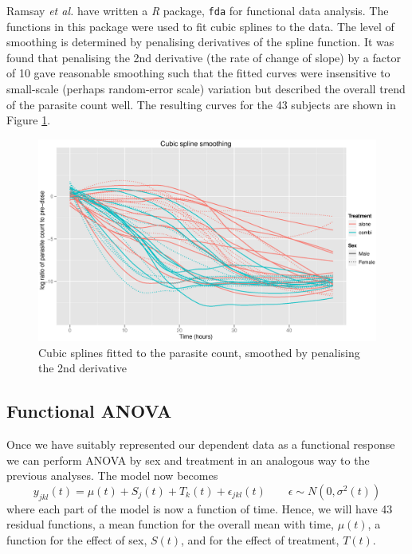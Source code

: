 Ramsay \textit{et al.} have written a \emph{R} package, \texttt{fda}\cite{fdaR, fdaRbook} for functional data analysis. The functions in this package were used to fit cubic splines to the data. The level of smoothing is determined by penalising derivatives of the spline function. It was found that penalising the 2nd derivative (the rate of change of slope) by a factor of 10 gave reasonable smoothing such that the fitted curves were insensitive to small-scale (perhaps random-error scale) variation but described the overall trend of the parasite count well. The resulting curves for the 43 subjects are shown in Figure \ref{cubicspline}.
\begin{figure}[h]
\includegraphics[width=150mm]{cubicspline.eps} 
\caption{Cubic splines fitted to the parasite count, smoothed by penalising the 2nd derivative}
\label{cubicspline}
\end{figure}

\subsection{Functional ANOVA}
Once we have suitably represented our dependent data as a functional response we can perform ANOVA by sex and treatment in an analogous way to the previous analyses. The model now becomes
$$y_{jkl}(t)=\mu(t)+S_{j}(t)+T_{k}(t)+\epsilon_{jkl}(t)\quad\quad\epsilon\sim N(0, \sigma^{2}(t))$$
where each part of the model is now a function of time. Hence, we will have 43 residual functions, a mean function for the overall mean with time, $\mu(t)$, a function for the effect of sex, $S(t)$, and for the effect of treatment, $T(t)$.

